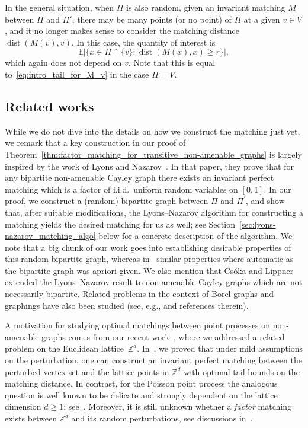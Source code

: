 \documentclass[11pt, reqno]{article}
\numberwithin{equation}{section}
\theoremstyle{definition}
\def\E{\mathbb{E}}
\def\Z{\mathbb{Z}}
\newcommand{\1}{\mathds{1}}
\DeclareMathOperator{\dist}{dist}
\begin{document}
In the general situation, when $\Pi$ is also random, given an invariant matching $M$ between $\Pi$ and $\Pi'$, there may be many points (or no point) of $\Pi$ at a given $v \in V$, and it no longer makes sense to consider the matching distance $\dist(M(v),v)$. In this case, the quantity of interest is
\[ \E |\{ x \in \Pi \cap \{v\} : \dist(M(x),x) \ge r\}| ,\]
which again does not depend on $v$. Note that this is equal to~\eqref{eq:intro_tail_for_M_v} in the case $\Pi=V$.


\subsection{Related works}
\label{subsec:related_works}

While we do not dive into the details on how we construct the matching just yet, we remark that a key construction in our proof of Theorem~\ref{thm:factor_matching_for_transitive_non-amenable_graphs} is largely inspired by the work of Lyons and Nazarov~\cite{lyons2011perfect}. 
In that paper, they prove that for any bipartite non-amenable Cayley graph there exists an invariant perfect matching which is a factor of i.i.d.\ uniform random variables on $[0,1]$. In our proof, we construct a (random) bipartite graph between $\Pi$ and $\Pi^\prime$, and show that, after suitable modifications, the Lyons--Nazarov algorithm for constructing a matching yields the desired matching for us as well; see Section~\ref{sec:lyons-nazarov_matching_algo} below for a concrete description of the algorithm. 
We note that a big chunk of our work goes into establishing desirable properties of this random bipartite graph, whereas in~\cite{lyons2011perfect} similar properties where automatic as the bipartite graph was apriori given.
We also mention that Cs\'oka and Lippner~\cite{Csoka-Lippner} extended the Lyons--Nazarov result to non-amenable Cayley graphs which are not necessarily bipartite. Related problems in the context of Borel graphs and graphings have also been studied (see, e.g., \cite{bowen2021perfect,kastner2023baire,kun2021measurable,marks2016baire} and references therein).

A motivation for studying optimal matchings between point processes on non-amenable graphs comes from our recent work~\cite{Elboim-Spinka-Yakir}, where we addressed a related problem on the Euclidean lattice~$\Z^d$. In~\cite{Elboim-Spinka-Yakir}, we proved that under mild assumptions on the perturbation, one can construct an invariant perfect matching between the perturbed vertex set and the lattice points in $\Z^d$ with optimal tail bounds on the matching distance. In contrast, for the Poisson point process the analogous question is well known to be delicate and strongly dependent on the lattice dimension $d \ge 1$; see~\cite{Hoffman-Holroyd-Peres, Holroyd-Pemantle-Peres-Schramm, timar2023factor}. Moreover, it is still unknown whether a \emph{factor} matching exists between $\Z^d$ and its random perturbations, see discussions in~\cite[Section~4.1]{Elboim-Spinka-Yakir}.
\end{document}
